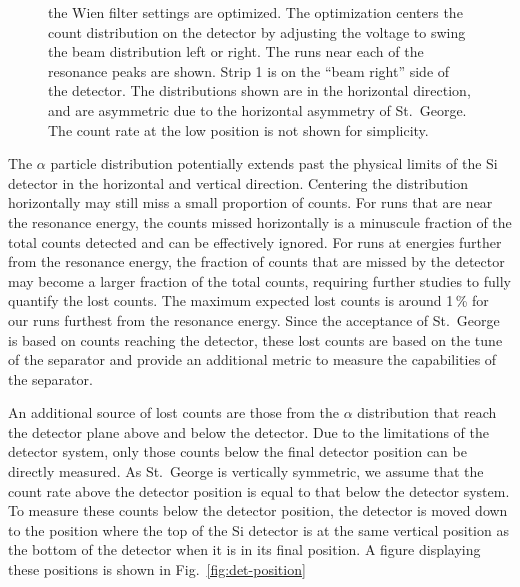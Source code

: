 \begin{figure}[h]
\begin{center}
{            the Wien filter settings are optimized. The optimization
            centers the count distribution on the detector by adjusting
            the voltage to swing the beam distribution left or right.
            The runs near each of the resonance peaks are shown. Strip 1
            is on the ``beam right'' side of the detector. The
            distributions shown are in the horizontal direction, and are
            asymmetric due to the horizontal asymmetry of St.\ George.
            The count rate at the low position is not shown for
            simplicity.}
        \label{fig:alpha-distribution-strips}
    \end{center}
\end{figure}

The $\alpha$ particle distribution potentially extends past the physical
limits of the Si detector in the horizontal and vertical direction.
Centering the distribution horizontally may still miss a small
proportion of counts. For runs that are near the resonance energy, the
counts missed horizontally is a minuscule fraction of the total counts
detected and can be effectively ignored. For runs at energies further
from the resonance energy, the fraction of counts that are missed by the
detector may become a larger fraction of the total counts, requiring
further studies to fully quantify the lost counts. The maximum expected
lost counts is around 1\,\% for our runs furthest from the resonance
energy. Since the acceptance of St.\ George is based on counts reaching
the detector, these lost counts are based on the tune of the separator
and provide an additional metric to measure the capabilities of the
separator.

An additional source of lost counts are those from the $\alpha$
distribution that reach the detector plane above and below the detector.
Due to the limitations of the detector system, only those counts below
the final detector position can be directly measured. As St.\ George is
vertically symmetric, we assume that the count rate above the detector
position is equal to that below the detector system. To measure these
counts below the detector position, the detector is moved down to the
position where the top of the Si detector is at the same vertical
position as the bottom of the detector when it is in its final position.
A figure displaying these positions is shown in
Fig.~\ref{fig:det-position}

